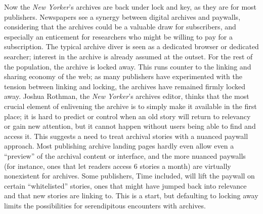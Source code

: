 Now the \emph{New Yorker}'s archives are back under lock and key, as they are for most publishers. Newspapers see a synergy between digital archives and paywalls, considering that the archives could be a valuable draw for subscribers, and especially an enticement for researchers who might be willing to pay for a subscription. The typical archive diver is seen as a dedicated browser or dedicated searcher; interest in the archive is already assumed at the outset. For the rest of the population, the archive is locked away. This runs counter to the linking and sharing economy of the web; as many publishers have experimented with the tension between linking and locking, the archives have remained firmly locked away. Joshua Rothman, the \emph{New Yorker}'s archives editor, thinks that the most crucial element of enlivening the archive is to simply make it available in the first place; it is hard to predict or control when an old story will return to relevancy or gain new attention, but it cannot happen without users being able to find and access it.\autocite{rothman_interview_2015} This suggests a need to treat archival stories with a nuanced paywall approach. Most publishing archive landing pages hardly even allow even a ``preview'' of the archival content or interface, and the more nuanced paywalls (for instance, ones that let readers access 6 stories a month) are virtually nonexistent for archives. Some publishers, Time included, will lift the paywall on certain ``whitelisted'' stories, ones that might have jumped back into relevance and that new stories are linking to.\autocite{rothman_interview_2015-1} This is a start, but defaulting to locking away limits the possibilities for serendipitous encounters with archives.

